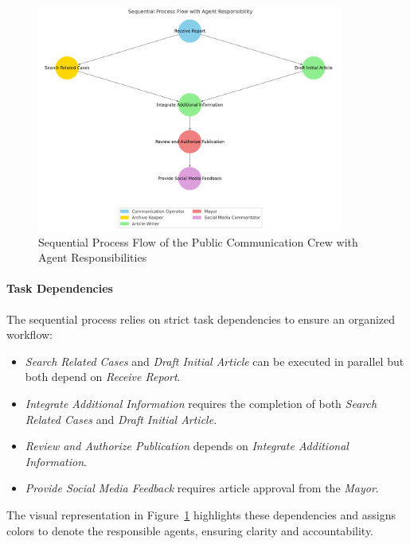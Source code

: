 \begin{figure}[ht!]
	\centering
	\includegraphics[width=0.9\textwidth]{figures/PC-process.png}
	\caption{Sequential Process Flow of the Public Communication Crew with Agent Responsibilities}
	\label{fig:public_comm_flow}
\end{figure}


\paragraph{Task Dependencies}
The sequential process relies on strict task dependencies to ensure an organized workflow:
\begin{itemize}
	\item \textit{Search Related Cases} and \textit{Draft Initial Article} can be executed in parallel but both depend on \textit{Receive Report}.
	\item \textit{Integrate Additional Information} requires the completion of both \textit{Search Related Cases} and \textit{Draft Initial Article}.
	\item \textit{Review and Authorize Publication} depends on \textit{Integrate Additional Information}.
	\item \textit{Provide Social Media Feedback} requires article approval from the \textit{Mayor}.
\end{itemize}

The visual representation in Figure~\ref{fig:public_comm_flow} highlights these dependencies and assigns colors to denote the responsible agents, ensuring clarity and accountability.
